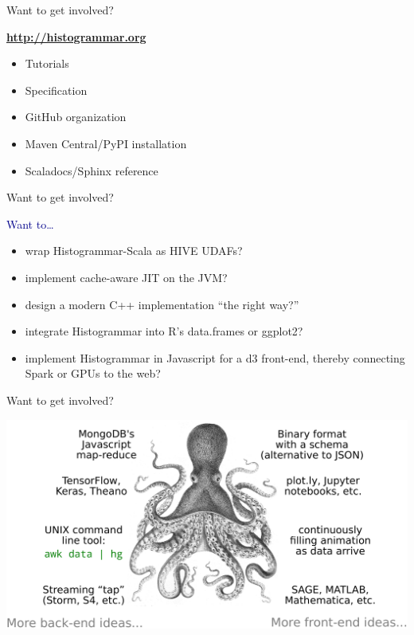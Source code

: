 \documentclass[aspectratio=169]{beamer}
\begin{document}
\begin{frame}{Want to get involved?}
\begin{center}
\begin{minipage}{0.55\linewidth}
\Large
\textcolor{blue}{\textbf{\url{http://histogrammar.org}}}

\begin{itemize}
\item Tutorials
\item Specification
\item GitHub organization
\item Maven Central/PyPI installation
\item Scaladocs/Sphinx reference
\end{itemize}
\end{minipage}
\end{center}
\end{frame}

\begin{frame}{Want to get involved?}
\begin{center}
\begin{minipage}{0.9\linewidth}
\Large
\textcolor{darkblue}{Want to\ldots}
\begin{itemize}\setlength{\itemsep}{0.35 cm}
\item wrap Histogrammar-Scala as HIVE UDAFs?
\item implement cache-aware JIT on the JVM?
\item design a modern C++ implementation ``the right way?''
\item integrate Histogrammar into R's data.frames or ggplot2?
\item implement Histogrammar in Javascript for a d3 front-end, thereby connecting Spark or GPUs to the web?
\end{itemize}
\end{minipage}
\end{center}
\end{frame}

\begin{frame}{Want to get involved?}
\begin{center}

\includegraphics[width=0.95\linewidth]{octopus_ending.pdf}
\vspace{0.1 cm}
\end{center}
\end{frame}
\end{document}

